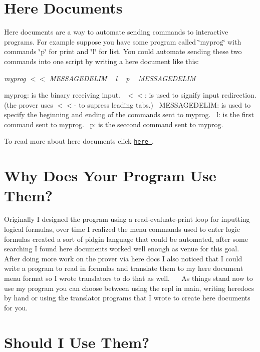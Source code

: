\section*{Here Documents}

Here documents are a way to automate sending commands to interactive programs. For example suppose you have some program called \char`\"{}myprog\char`\"{} with commands \char`\"{}p\char`\"{} for print and \char`\"{}l\char`\"{} for list. You could automate sending these two commands into one script by writing a here document like this\+:

{\itshape  {\ttfamily  myprog $<$$<$ M\+E\+S\+S\+A\+G\+E\+D\+E\+L\+IM ~\newline
 l ~\newline
 p ~\newline
 M\+E\+S\+S\+A\+G\+E\+D\+E\+L\+IM ~\newline
 } }

myprog\+: is the binary receiving input.~\newline
 $<$$<$\+: is used to signify input redirection. (the prover uses $<$$<$-\/ to supress leading tabs.)~\newline
 M\+E\+S\+S\+A\+G\+E\+D\+E\+L\+IM\+: is used to specify the beginning and ending of the commands sent to myprog.~\newline
 l\+: is the first command sent to myprog.~\newline
 p\+: is the seccond command sent to myprog.~\newline


To read more about here documents click \href{http://www.tldp.org/LDP/abs/html/here-docs.html}{\tt here }. \section*{Why Does Your Program Use Them?}

Originally I designed the program using a read-\/evaluate-\/print loop for inputting logical formulas, over time I realized the menu commands used to enter logic formulas created a sort of pidgin language that could be automated, after some searching I found here documents worked well enough as venue for this goal. After doing more work on the prover via here docs I also noticed that I could write a program to read in formulas and translate them to my here document menu format so I wrote translators to do that as well.~\newline
~\newline
 As things stand now to use my program you can choose between using the repl in main, writing heredocs by hand or using the translator programs that I wrote to create here documents for you. \section*{Should I Use Them?}

